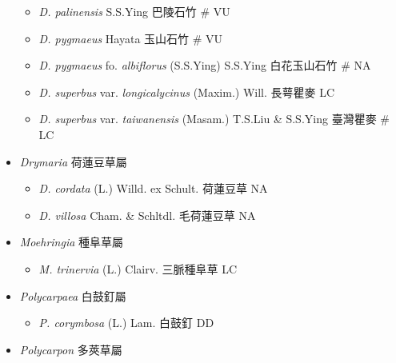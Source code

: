 \begin{itemize}
  \begin{itemize}
        \item[] \textit{D. palinensis} S.S.Ying  巴陵石竹  \# VU
        \item[] \textit{D. pygmaeus} Hayata  玉山石竹  \# VU
        \item[] \textit{D. pygmaeus} fo. \textit{albiflorus} (S.S.Ying) S.S.Ying  白花玉山石竹  \# NA
        \item[] \textit{D. superbus} var. \textit{longicalycinus} (Maxim.) Will.  長萼瞿麥   LC
        \item[] \textit{D. superbus} var. \textit{taiwanensis} (Masam.) T.S.Liu \& S.S.Ying  臺灣瞿麥  \# LC
  \end{itemize}
 \item[] \textit{Drymaria} 荷蓮豆草屬
                                
  \begin{itemize}
        \item[] \textit{D. cordata} (L.) Willd. ex Schult.  荷蓮豆草   NA
        \item[] \textit{D. villosa} Cham. \& Schltdl.  毛荷蓮豆草   NA
  \end{itemize}
 \item[] \textit{Moehringia} 種阜草屬
                                
  \begin{itemize}
        \item[] \textit{M. trinervia} (L.) Clairv.  三脈種阜草   LC
  \end{itemize}
 \item[] \textit{Polycarpaea} 白鼓釘屬
                                
  \begin{itemize}
        \item[] \textit{P. corymbosa} (L.) Lam.  白鼓釘   DD
  \end{itemize}
 \item[] \textit{Polycarpon} 多莢草屬
                                

\end{itemize}
